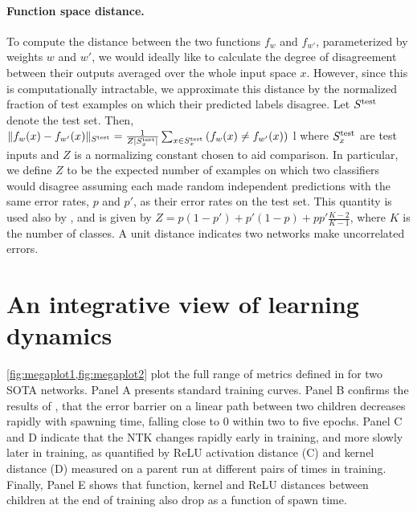 \documentclass{article}
\begin{document}
\paragraph{Function space distance.}
To compute the distance between the two functions $f_w$ and $f_{w'}$, parameterized by weights $w$ and $w'$, we would ideally like to calculate the degree of disagreement between their outputs averaged over the whole input space $x$.  
However, since this is computationally intractable, we approximate this distance by the normalized fraction of test examples on which their predicted labels disagree. 
Let $S^{\textrm{test}}$ denote the test set. 
Then,
$
    \lVert f_w(x) - f_{w'}(x) \rVert_{S^{\textrm{test}}} = 
    \frac{1}{Z |S^{\textrm{test}}_x|}\sum_{x \in S^{\textrm{test}}_x} \left(f_w(x) \neq f_{w'}(x) \right)
$ l
where $S^{\textrm{test}}_x$ are test inputs and $Z$ is a normalizing constant chosen to aid comparison. In particular, we define $Z$ to be 
the expected number of examples on which two classifiers 
%
would disagree assuming each made random independent predictions with the same error rates, $p$ and $p'$, as their error rates on the test set. This quantity is used also by \citep{fort2019deep},
and is given by $Z = p(1-p') + p'(1-p) + pp'\frac{K-2}{K-1}$, where $K$ is the number of classes.
%
 A unit distance indicates two networks make uncorrelated errors.
%

%

%



\vspace{-0.3cm}
\section{An integrative view of learning dynamics}
\vspace{-0.3cm}

\cref{fig:megaplot1,fig:megaplot2} plot the full range of metrics defined in  for two SOTA networks.
Panel A presents standard training curves.
Panel B confirms the results of \citep{frankle2019linear}, that the error barrier on a linear path between two children decreases rapidly with spawning time, falling close to $0$ within two to five epochs. 
Panel C and D indicate that the NTK changes rapidly early in training, and more slowly later in training,  as quantified by ReLU activation distance (C) and kernel distance (D) measured on a parent run at different pairs of times in training.
Finally, Panel E shows that function, kernel and ReLU distances between children at the end of training also drop as a function of spawn time.
\end{document}
